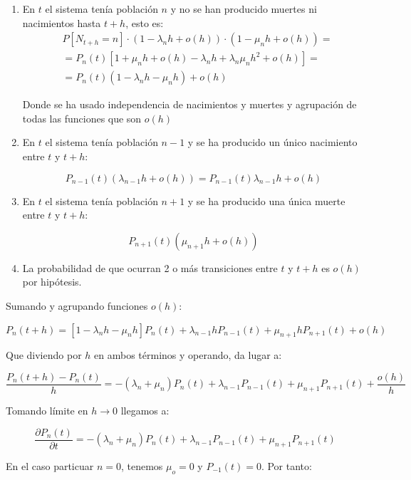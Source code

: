 \documentclass[a4paper,10pt]{scrartcl}
\theoremstyle{definition}
\numberwithin{equation}{section}
\begin{document}
	\begin{enumerate}
		\item En $t$ el sistema tenía población $n$ y no se han producido muertes ni nacimientos hasta $t+h$, esto es:
		\begin{align*}
		&  P[N_{t+h}=n] \cdot (1-\lambda_n h + o(h)) \cdot (1-\mu_n h + o(h))= \\
		&= P_n(t)[1+\mu_n h + o(h) -\lambda_n h + \lambda_n \mu_n h^2 + o(h)] = \\
		&= P_n(t)(1-\lambda_n h - \mu_n h) + o(h)
		\end{align*}
		
		Donde se ha usado independencia de nacimientos y muertes y agrupación de todas las funciones que son $o(h)$
		
		\item En $t$ el sistema tenía población $n-1$ y se ha producido un único nacimiento entre $t$ y $t+h$:
		
		\[P_{n-1}(t) (\lambda_{n-1}h + o(h)) = P_{n-1}(t) \lambda_{n-1} h + o(h)\]
		
		\item En $t$ el sistema tenía población $n+1$ y se ha producido una única muerte entre $t$ y $t+h$:
		
		\[P_{n+1}(t) (\mu_{n+1} h + o(h))\]
		
		\item La probabilidad de que ocurran 2 o más transiciones entre $t$ y $t+h$ es $o(h)$ por hipótesis.
	\end{enumerate}
	
	
	Sumando y agrupando funciones $o(h)$:
	
	\[P_n(t+h) = [1-\lambda_n h -\mu_n h] P_n(t) + \lambda_{n-1} h P_{n-1}(t) + \mu_{n+1} h P_{n+1}(t) + o(h)\]
	
	
	Que diviendo por $h$ en ambos términos y operando, da lugar a:
	
	\[\frac{P_n(t+h) - P_n(t)}{h} = -(\lambda_n + \mu_n) P_n(t) + \lambda_{n-1} P_{n-1}(t) + \mu_{n+1}P_{n+1}(t) + \frac{o(h)}{h}\]
	
	Tomando límite en $h\rightarrow 0$ llegamos a:
	
	\begin{equation}
	\frac{\partial P_n(t)}{\partial t} = -(\lambda_n + \mu_n) P_n(t) + \lambda_{n-1}P_{n-1}(t) + \mu_{n+1}P_{n+1}(t)
	\label{eq:recpn(t)}
	\end{equation}
	
	En el caso particuar $n=0$, tenemos $\mu_o = 0$ y $P_{-1}(t) = 0$. Por tanto:
	
\end{document}
